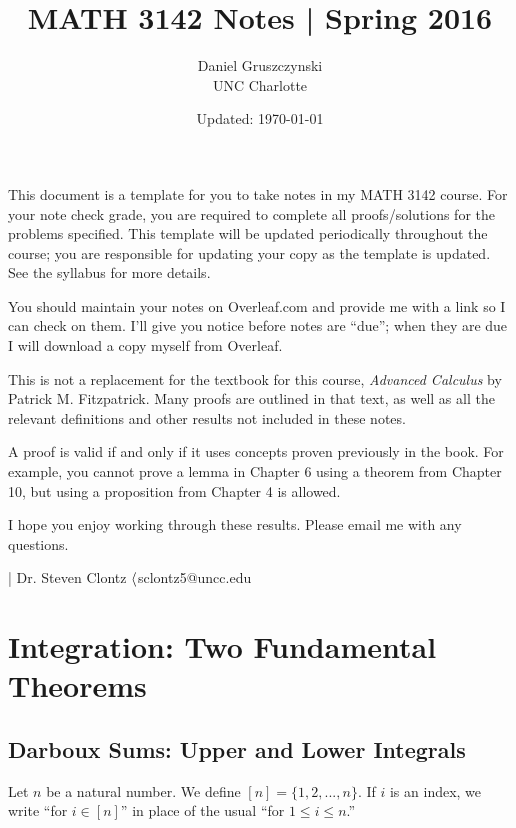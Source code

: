\documentclass[letterpaper, twoside, 12pt]{book}
\title{MATH 3142 Notes | Spring 2016}
\date{Updated: \today}
\author{Daniel Gruszczynski\\ UNC Charlotte}
\begin{document}
\maketitle

This document is a template for you to take notes in my MATH 3142 course.
For your note check grade, you are required to complete all proofs/solutions
for the problems specified. This template will be updated periodically
throughout the course; you are responsible for updating your copy
as the template is updated. See the syllabus for more details.

You should maintain your notes on Overleaf.com and provide me with a
link so I can check on them. I'll give you notice before notes are ``due'';
when they are due I will download a copy myself from Overleaf.

This is not a replacement for the textbook for this course,
\textit{Advanced Calculus} by Patrick M. Fitzpatrick. Many proofs are
outlined in that text, as well as all the relevant definitions and other
results not included in these notes.

A proof is valid if and only if it uses concepts proven previously in
the book. For example, you cannot prove a lemma in Chapter 6 using
a theorem from Chapter 10, but using a proposition from Chapter 4
is allowed.

I hope you enjoy working through these results. Please email me with
any questions.

\noindent| Dr. Steven Clontz \(\langle\)sclontz5@uncc.edu\(\>\)
















\setcounter{chapter}{5}
\chapter{Integration: Two Fundamental Theorems}







\section{Darboux Sums: Upper and Lower Integrals}

\begin{definition}
    Let \(n\) be a natural number. We define \([n] = \{1, 2, ..., n\}\). If 
    \(i\) is an index, we write ``for \(i \in [n]\)'' in place of the usual 
    ``for \(1 \leq i \leq n\).''
\end{definition}
\end{document}
